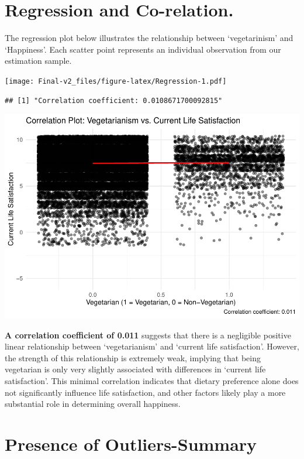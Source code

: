 \documentclass[
]{article}
\begin{document}
\section{Regression and Co-relation.}\label{regression-and-co-relation.}

The regression plot below illustrates the relationship between
`vegetarinism' and `Happiness'. Each scatter point represents an
individual observation from our estimation sample.

\texttt{[image: Final-v2\_files/figure-latex/Regression-1.pdf]}

\begin{verbatim}
## [1] "Correlation coefficient: 0.0108671700092815"
\end{verbatim}

\includegraphics{Final-v2_files/figure-latex/Correlation-1.pdf}

\textbf{A correlation coefficient of 0.011} suggests that there is a
negligible positive linear relationship between `vegetarianism' and
`current life satisfaction'. However, the strength of this relationship
is extremely weak, implying that being vegetarian is only very slightly
associated with differences in `current life satisfaction'. This minimal
correlation indicates that dietary preference alone does not
significantly influence life satisfaction, and other factors likely play
a more substantial role in determining overall happiness.

\section{Presence of
Outliers-Summary}\label{presence-of-outliers-summary}
\end{document}
